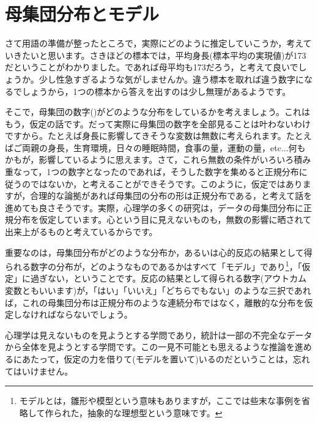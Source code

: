\documentclass{ltjsbook}
\begin{document}
\section{母集団分布とモデル}
さて用語の準備が整ったところで，実際にどのように推定していこうか，考えていきたいと思います。さきほどの標本では，平均身長(標本平均の実現値)が173だということがわかりました。であれば母平均も173だろう，と考えて良いでしょうか。少し性急すぎるような気がしませんか。違う標本を取れば違う数字になるでしょうから，1つの標本から答えを出すのは少し無理があるようです。


そこで，母集団の数字()がどのような分布をしているかを考えましょう。これはもう，仮定の話です。だって実際に母集団の数字を全部見ることは叶わないわけですから。たとえば身長に影響してきそうな変数は無数に考えられます。たとえばご両親の身長，生育環境，日々の睡眠時間，食事の量，運動の量，etc...何もかもが，影響しているように思えます。さて，これら無数の条件がいろいろ積み重なって，1つの数字となったのであれば，そうした数字を集めると正規分布に従うのではないか，と考えることができそうです。このように，仮定ではありますが，合理的な論拠があれば母集団の分布の形は正規分布である，と考えて話を進めても良さそうです。実際，心理学の多くの研究は，データの母集団分布に正規分布を仮定しています。心という目に見えないものも，無数の影響に晒されて出来上がるものと考えているからです。

重要なのは，母集団分布がどのような分布か，あるいは心的反応の結果として得られる数字の分布が，どのようなものであるかはすべて「モデル」であり\footnote{モデルとは，雛形や模型という意味もありますが，ここでは些末な事例を省略して作られた，抽象的な理想型という意味です。}，「仮定」に過ぎない，ということです。反応の結果として得られる数字(アウトカム変数ともいいます)が，「はい」「いいえ」「どちらでもない」のような三択であれば，これの母集団分布は正規分布のような連続分布ではなく，離散的な分布を仮定しなければならないでしょう。

心理学は見えないものを見ようとする学問であり，統計は一部の不完全なデータから全体を見ようとする学問です。この一見不可能とも思えるような推論を進めるにあたって，仮定の力を借りて(モデルを置いて)いるのだということは，忘れてはいけません。
\end{document}
